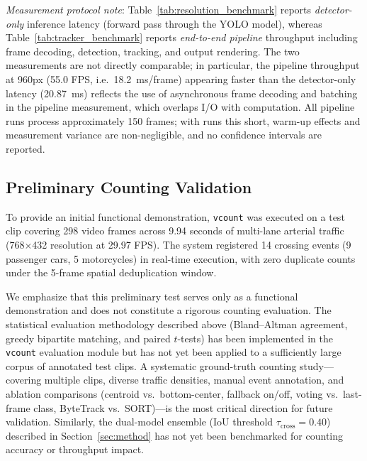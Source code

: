 \textit{Measurement protocol note}: Table~\ref{tab:resolution_benchmark} reports \emph{detector-only} inference latency (forward pass through the YOLO model), whereas Table~\ref{tab:tracker_benchmark} reports \emph{end-to-end pipeline} throughput including frame decoding, detection, tracking, and output rendering. The two measurements are not directly comparable; in particular, the pipeline throughput at 960px (55.0 FPS, i.e.\ 18.2~ms/frame) appearing faster than the detector-only latency (20.87~ms) reflects the use of asynchronous frame decoding and batching in the pipeline measurement, which overlaps I/O with computation. All pipeline runs process approximately 150 frames; with runs this short, warm-up effects and measurement variance are non-negligible, and no confidence intervals are reported.

\subsection{Preliminary Counting Validation}
To provide an initial functional demonstration, \texttt{vcount} was executed on a test clip covering 298 video frames across 9.94 seconds of multi-lane arterial traffic (768$\times$432 resolution at 29.97 FPS). The system registered 14 crossing events (9 passenger cars, 5 motorcycles) in real-time execution, with zero duplicate counts under the 5-frame spatial deduplication window.

We emphasize that this preliminary test serves only as a functional demonstration and does not constitute a rigorous counting evaluation. The statistical evaluation methodology described above (Bland--Altman agreement, greedy bipartite matching, and paired $t$-tests) has been implemented in the \texttt{vcount} evaluation module but has not yet been applied to a sufficiently large corpus of annotated test clips. A systematic ground-truth counting study---covering multiple clips, diverse traffic densities, manual event annotation, and ablation comparisons (centroid vs.\ bottom-center, fallback on/off, voting vs.\ last-frame class, ByteTrack vs.\ SORT)---is the most critical direction for future validation. Similarly, the dual-model ensemble (IoU threshold $\tau_{\text{cross}} = 0.40$) described in Section~\ref{sec:method} has not yet been benchmarked for counting accuracy or throughput impact.
